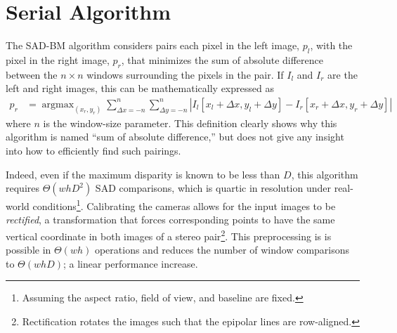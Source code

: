 \documentclass{article}
\newcommand{\abs}[1]{\left|#1\right|}
\DeclareMathOperator*{\argmin}{argmax}
\begin{document}
\section{Serial Algorithm}
\label{sec:serial}
The SAD-BM algorithm considers pairs each pixel in the left image, $p_l$, with
the pixel in the right image, $p_r$, that minimizes the sum of absolute
difference between the $n \times n$ windows surrounding the pixels in the pair.
If $I_l$ and $I_r$ are the left and right images, this can be mathematically
expressed as
\begin{align*}
    p_r &= \argmin_{(x_r, y_r)}
             \sum_{\Delta x = -n}^n \sum_{\Delta y = -n}^n \abs{
                 I_l[x_l + \Delta x, y_l + \Delta y]
               - I_r[x_r + \Delta x, y_r + \Delta y]
           }
\end{align*}
where $n$ is the window-size parameter. This definition clearly shows why this
algorithm is named ``sum of absolute difference,'' but does not give any
insight into how to efficiently find such pairings.

Indeed, even if the maximum disparity is known to be less than $D$, this
algorithm requires $\Theta(whD^2)$ SAD comparisons, which is quartic in
resolution under real-world conditions\footnote{Assuming the aspect ratio,
field of view, and baseline are fixed.}. Calibrating the cameras allows for the
input images to be \textit{rectified}, a transformation that forces
corresponding points to have the same vertical coordinate in both images of a
stereo pair\footnote{Rectification rotates the images such that the epipolar
lines are row-aligned.}. This preprocessing is is possible in $\Theta(wh)$
operations and reduces the number of window comparisons to $\Theta(whD)$; a
linear performance increase.
\end{document}
